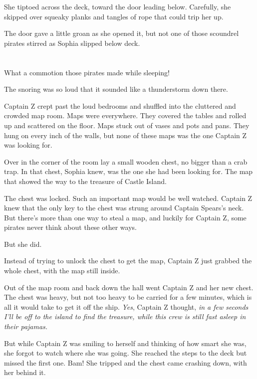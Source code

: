 \documentclass[12pt]{extbook}
\begin{document}
  She tiptoed across the deck, toward the door leading below. Carefully,
  she skipped over squeaky planks and tangles of rope that could trip her
  up.
  
  The door gave a little groan as she opened it, but not one of those
  scoundrel pirates stirred as Sophia slipped below deck.
  
  \section{}\label{section-3}
  
  What a commotion those pirates made while sleeping!
  
  The snoring was so loud that it sounded like a thunderstorm down there.
  
  Captain Z crept past the loud bedrooms and shuffled into the cluttered
  and crowded map room. Maps were everywhere. They covered the tables and
  rolled up and scattered on the floor. Maps stuck out of vases and pots
  and pans. They hung on every inch of the walls, but none of these maps
  was the one Captain Z was looking for.
  
  Over in the corner of the room lay a small wooden chest, no bigger than
  a crab trap. In that chest, Sophia knew, was the one she had been
  looking for. The map that showed the way to the treasure of Castle
  Island.
  
  The chest was locked. Such an important map would be well watched.
  Captain Z knew that the only key to the chest was strung around Captain
  Spears's neck. But there's more than one way to steal a map, and luckily
  for Captain Z, some pirates never think about these other ways.
  
  But she did.
  
  Instead of trying to unlock the chest to get the map, Captain Z just
  grabbed the whole chest, with the map still inside.
  
  Out of the map room and back down the hall went Captain Z and her new
  chest. The chest was heavy, but not too heavy to be carried for a few
  minutes, which is all it would take to get it off the ship. \emph{Yes},
  Captain Z thought, \emph{in a few seconds I'll be off to the island to
  find the treasure, while this crew is still fast asleep in their
  pajamas.}
  
  But while Captain Z was smiling to herself and thinking of how smart she
  was, she forgot to watch where she was going. She reached the steps to
  the deck but missed the first one. Bam! She tripped and the chest came
  crashing down, with her behind it.
  
\end{document}
